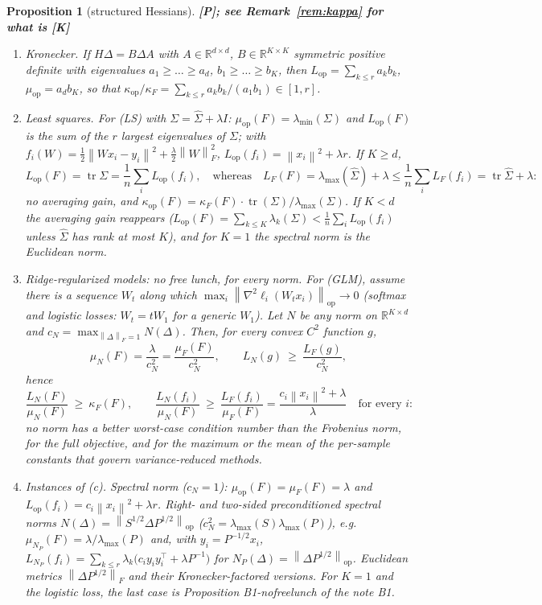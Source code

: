 \documentclass[11pt]{article}
\newtheorem{proposition}[theorem]{Proposition}
\theoremstyle{definition}
\theoremstyle{remark}
\newcommand{\R}{\mathbb{R}}
\newcommand{\norm}[1]{\left\|#1\right\|}
\newcommand{\nop}[1]{\left\|#1\right\|_{\mathrm{op}}}
\newcommand{\nF}[1]{\left\|#1\right\|_{F}}
\newcommand{\tr}{\operatorname{tr}}
\newcommand{\Lop}{L_{\mathrm{op}}}
\newcommand{\muop}{\mu_{\mathrm{op}}}
\newcommand{\kop}{\kappa_{\mathrm{op}}}
\newcommand{\kF}{\kappa_{F}}
\newcommand{\lmin}{\lambda_{\min}}
\newcommand{\lmax}{\lambda_{\max}}
\begin{document}
\begin{proposition}[structured Hessians]\label{prop:struct} \textbf{[P]; see Remark~\ref{rem:kappa} for what is [K]}
\begin{enumerate}[label=(\alph*)]
\item \emph{Kronecker.} If $H\Delta=B\Delta A$ with $A\in\R^{d\times d}$, $B\in\R^{K\times K}$ symmetric positive definite
with eigenvalues $a_1\ge\dots\ge a_d$, $b_1\ge\dots\ge b_K$, then
$\Lop=\sum_{k\le r}a_kb_k$, $\muop=a_db_K$, so that $\kop/\kF=\sum_{k\le r}a_kb_k/(a_1b_1)\in[1,r]$.
\item \emph{Least squares.} For (LS) with $\Sigma=\hat\Sigma+\lambda I$: $\muop(F)=\lmin(\Sigma)$ and $\Lop(F)$ is the sum
of the $r$ largest eigenvalues of $\Sigma$; with $f_i(W)=\frac12\norm{Wx_i-y_i}^2+\frac\lambda2\nF W^2$,
$\Lop(f_i)=\norm{x_i}^2+\lambda r$. If $K\ge d$,
\[
\Lop(F)=\tr\Sigma=\frac1n\sum_i\Lop(f_i),\quad\text{whereas}\quad
L_F(F)=\lmax(\hat\Sigma)+\lambda\le\frac1n\sum_iL_F(f_i)=\tr\hat\Sigma+\lambda :
\]
\emph{no averaging gain}, and $\kop(F)=\kF(F)\cdot\tr(\Sigma)/\lmax(\Sigma)$. If $K<d$ the averaging gain reappears
($\Lop(F)=\sum_{k\le K}\lambda_k(\Sigma)<\frac1n\sum_i\Lop(f_i)$ unless $\hat\Sigma$ has rank at most $K$), and for $K=1$ the
spectral norm is the Euclidean norm.
\item \emph{Ridge-regularized models: no free lunch, for every norm.} For (GLM), assume there is a sequence $W_t$ along
which $\max_i\nop{\nabla^2\ell_i(W_tx_i)}\to0$ (softmax and logistic losses: $W_t=tW_1$ for a generic $W_1$). Let $N$ be
\emph{any} norm on $\R^{K\times d}$ and $c_N=\max_{\nF\Delta=1}N(\Delta)$. Then, for every convex $C^2$ function $g$,
\[
\mu_N(F)=\frac{\lambda}{c_N^2}=\frac{\mu_F(F)}{c_N^2},\qquad L_N(g)\ \ge\ \frac{L_F(g)}{c_N^2},
\]
hence
\[
\frac{L_N(F)}{\mu_N(F)}\ \ge\ \kF(F),\qquad \frac{L_N(f_i)}{\mu_N(F)}\ \ge\ \frac{L_F(f_i)}{\mu_F(F)}=\frac{c_i\norm{x_i}^2+\lambda}{\lambda}\quad\text{for every } i :
\]
no norm has a better worst-case condition number than the Frobenius norm, for the full objective, and for the maximum
or the mean of the per-sample constants that govern variance-reduced methods.
\item \emph{Instances of (c).} Spectral norm ($c_N=1$): $\muop(F)=\mu_F(F)=\lambda$ and $\Lop(f_i)=c_i\norm{x_i}^2+\lambda
r$. Right- and two-sided preconditioned spectral norms $N(\Delta)=\nop{S^{1/2}\Delta P^{1/2}}$ ($c_N^2=\lmax(S)\lmax(P)$),
e.g.\ $\mu_{N_P}(F)=\lambda/\lmax(P)$ and, with $y_i=P^{-1/2}x_i$,
$L_{N_P}(f_i)=\sum_{k\le r}\lambda_k\big(c_iy_iy_i^\top+\lambda P^{-1}\big)$ for $N_P(\Delta)=\nop{\Delta P^{1/2}}$.
Euclidean metrics $\nF{\Delta P^{1/2}}$ and their Kronecker-factored versions. For $K=1$ and the logistic loss, the
last case is Proposition B1-nofreelunch of the note B1.
\end{enumerate}
\end{proposition}
\end{document}
